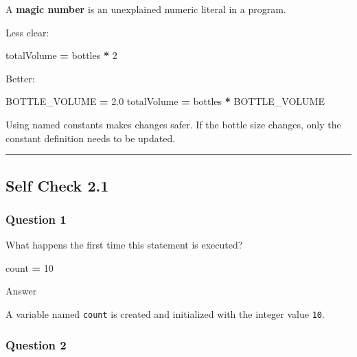 \documentclass[
]{article}
\newenvironment{Shaded}{\begin{snugshade}}{\end{snugshade}}
\newcommand{\DecValTok}[1]{\textcolor[rgb]{0.00,0.00,0.81}{#1}}
\newcommand{\FloatTok}[1]{\textcolor[rgb]{0.00,0.00,0.81}{#1}}
\newcommand{\NormalTok}[1]{#1}
\newcommand{\OperatorTok}[1]{\textcolor[rgb]{0.81,0.36,0.00}{\textbf{#1}}}
\begin{document}
A \textbf{magic number} is an unexplained numeric literal in a program.

Less clear:

\begin{Shaded}
\begin{Highlighting}[]
\NormalTok{totalVolume }\OperatorTok{=}\NormalTok{ bottles }\OperatorTok{*} \DecValTok{2}
\end{Highlighting}
\end{Shaded}

Better:

\begin{Shaded}
\begin{Highlighting}[]
\NormalTok{BOTTLE\_VOLUME }\OperatorTok{=} \FloatTok{2.0}
\NormalTok{totalVolume }\OperatorTok{=}\NormalTok{ bottles }\OperatorTok{*}\NormalTok{ BOTTLE\_VOLUME}
\end{Highlighting}
\end{Shaded}

Using named constants makes changes safer. If the bottle size changes,
only the constant definition needs to be updated.

\begin{center}\rule{0.5\linewidth}{0.5pt}\end{center}

\subsection{Self Check 2.1}\label{self-check-2.1}

\subsubsection{Question 1}\label{question-1}

What happens the first time this statement is executed?

\begin{Shaded}
\begin{Highlighting}[]
\NormalTok{count }\OperatorTok{=} \DecValTok{10}
\end{Highlighting}
\end{Shaded}

Answer

A variable named \texttt{count} is created and initialized with the
integer value \texttt{10}.

\subsubsection{Question 2}\label{question-2}
\end{document}
